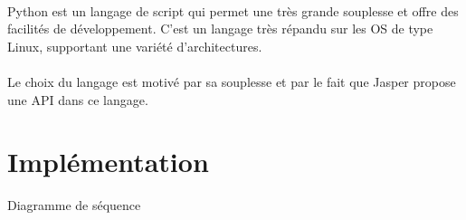 \documentclass[12pt]{article}
\begin{document}
        \paragraph{}
        Python est un langage de script qui permet une très grande souplesse et offre des facilités de développement. C'est un langage très répandu sur les OS de type Linux, supportant une variété d'architectures.
        
        \paragraph{}
	    Le choix du langage est motivé par sa souplesse et par le fait que Jasper propose une API dans ce langage.
	    
	\section{Implémentation}
		Diagramme de séquence
		
\end{document}
